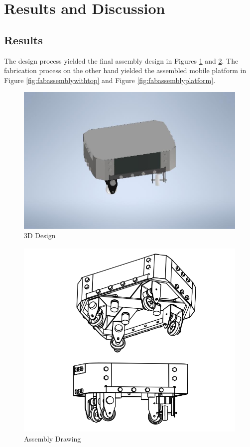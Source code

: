 \section{Results and Discussion}

\subsection{Results}
The design process yielded the final assembly design in Figures \ref{fig:final3D} and \ref{fig:finalassembly}. The fabrication process on the other hand yielded the assembled mobile platform in Figure \ref{fig:fabassemblywithtop} and Figure \ref{fig:fabassemblyplatform}.


\begin{figure}[H]
    \centering
    \includegraphics[scale = 0.6]{Figures/final3D.jpg}
    \caption{3D Design}
    \label{fig:final3D}
\end{figure}

\begin{figure}[H]
    \centering
    \includegraphics[scale = 0.8]{Figures/NewFinalDesignDWG.png}
    \caption{Assembly Drawing}
    \label{fig:finalassembly}
\end{figure}

